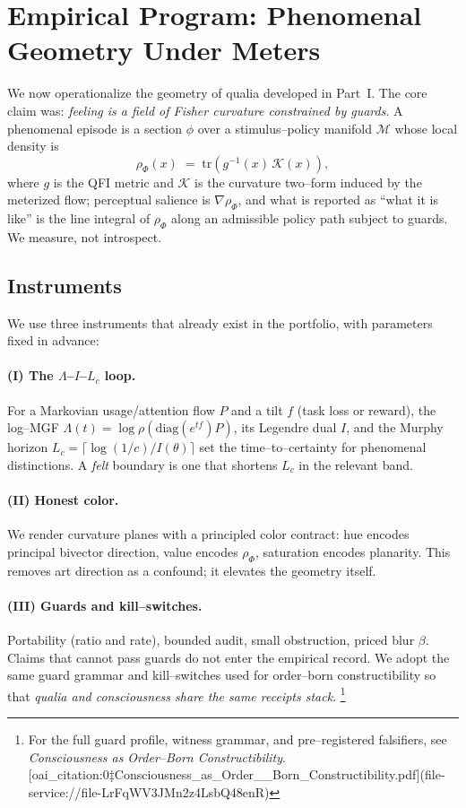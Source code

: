 \documentclass[11pt]{article}
\newcommand{\1}{\mathbf{1}}
\begin{document}
\section{Empirical Program: Phenomenal Geometry Under Meters}
\label{sec:empirical-program}

We now operationalize the geometry of qualia developed in Part~I. The core claim was: \emph{feeling is a field of Fisher curvature constrained by guards}. A phenomenal episode is a section $\phi$ over a stimulus--policy manifold $\mathcal{M}$ whose local density is
\[
\rho_{\Phi}(x) \;=\; \mathrm{tr}\!\left(g^{-1}(x)\,\mathcal{K}(x)\right),
\]
where $g$ is the QFI metric and $\mathcal{K}$ is the curvature two--form induced by the meterized flow; perceptual salience is $\nabla \rho_{\Phi}$, and what is reported as ``what it is like'' is the line integral of $\rho_{\Phi}$ along an admissible policy path subject to guards. We measure, not introspect.

\subsection{Instruments}
We use three instruments that already exist in the portfolio, with parameters fixed in advance:

\paragraph{(I) The $\Lambda$--$I$--$L_c$ loop.} For a Markovian usage/attention flow $P$ and a tilt $f$ (task loss or reward), the log--MGF $\Lambda(t)=\log \rho(\mathrm{diag}(e^{tf})P)$, its Legendre dual $I$, and the Murphy horizon $L_c=\lceil \log(1/c)/I(\theta)\rceil$ set the time--to--certainty for phenomenal distinctions. A \emph{felt} boundary is one that shortens $L_c$ in the relevant band.

\paragraph{(II) Honest color.} We render curvature planes with a principled color contract: hue encodes principal bivector direction, value encodes $\rho_{\Phi}$, saturation encodes planarity. This removes art direction as a confound; it elevates the geometry itself.

\paragraph{(III) Guards and kill--switches.} Portability (ratio and rate), bounded audit, small obstruction, priced blur $\beta$. Claims that cannot pass guards do not enter the empirical record. We adopt the same guard grammar and kill--switches used for order--born constructibility so that \emph{qualia and consciousness share the same receipts stack}.%
\footnote{For the full guard profile, witness grammar, and pre--registered falsifiers, see \emph{Consciousness as Order--Born Constructibility}.  [oai_citation:0‡Consciousness_as_Order__Born_Constructibility.pdf](file-service://file-LrFqWV3JMn2z4LsbQ48enR)}
\end{document}
